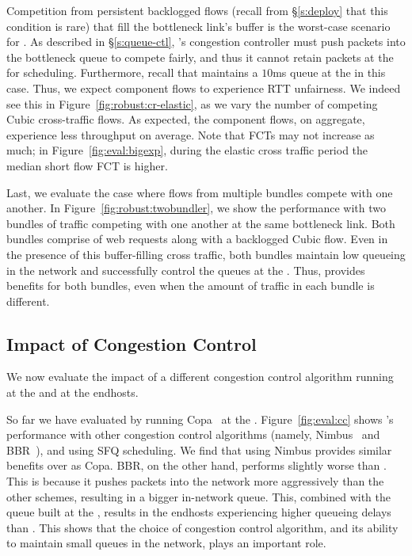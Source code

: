 

 Competition from persistent backlogged flows (recall from \S\ref{s:deploy} that this condition is rare) that fill the bottleneck link's buffer is the worst-case scenario for \name.
As described in \S\ref{s:queue-ctl}, \name's congestion controller must push packets into the bottleneck queue to compete fairly, and thus it cannot retain packets at the \inbox for scheduling. 
Furthermore, recall that \name maintains a $10$ms queue at the \inbox in this case. Thus, we expect component flows to experience RTT unfairness.
We indeed see this in Figure~\ref{fig:robust:cr-elastic}, as we vary the number of competing Cubic cross-traffic flows.
As expected, the component flows, on aggregate, experience \bundlerElasticTputWorseness less throughput on average.
Note that FCTs may not increase as much; in Figure~\ref{fig:eval:bigexp}, during the elastic cross traffic period the median short flow FCT is
\bigexpElasticSlowdownWorseness higher.


 Last, we evaluate the case where flows from multiple bundles compete with one another. 
In Figure~\ref{fig:robust:twobundler}, we show the performance with two bundles of traffic competing with one another at the same bottleneck link. 
Both bundles comprise of web requests along with a backlogged Cubic flow. 
Even in the presence of this buffer-filling cross traffic, both bundles maintain low queueing in the network and successfully control the queues at the \inbox.
Thus, \name provides benefits for both bundles, even when the amount of traffic in each bundle is different.  

\subsection{Impact of Congestion Control}\label{s:eval:cc}

We now evaluate the impact of a different congestion control algorithm running at the \inbox and at the endhosts.



 So far we have evaluated \name by running Copa~\cite{copa} at the \inbox.  
Figure~\ref{fig:eval:cc} shows \name's performance with other congestion control algorithms (namely, Nimbus~\cite{nimbus} and BBR~\cite{bbr}), and using SFQ scheduling. 
We find that using Nimbus provides similar benefits over \baseline as Copa. 
BBR, on the other hand, performs slightly worse than \baseline. 
This is because it pushes packets into the network more aggressively than the other schemes, resulting in a bigger in-network queue.
This, combined with the queue built at the \name, results in the endhosts experiencing higher queueing delays than \baseline. This shows that the choice of congestion control algorithm, and its ability to maintain small queues in the network, plays an important role. 


